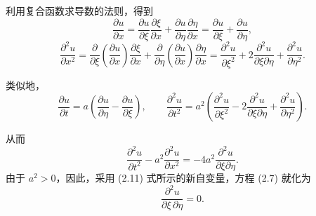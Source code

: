 利用复合函数求导数的法则，得到
\[
\frac{\partial u}{\partial x}
= \frac{\partial u}{\partial \xi}\frac{\partial \xi}{\partial x}
+ \frac{\partial u}{\partial \eta}\frac{\partial \eta}{\partial x}
= \frac{\partial u}{\partial \xi} + \frac{\partial u}{\partial \eta},
\]
\[
\frac{\partial^2 u}{\partial x^2}
= \frac{\partial}{\partial \xi}\!\left(\frac{\partial u}{\partial x}\right)\frac{\partial \xi}{\partial x}
+ \frac{\partial}{\partial \eta}\!\left(\frac{\partial u}{\partial x}\right)\frac{\partial \eta}{\partial x}
= \frac{\partial^2 u}{\partial \xi^2}
+ 2\frac{\partial^2 u}{\partial \xi \partial \eta}
+ \frac{\partial^2 u}{\partial \eta^2}.
\]

类似地，
\[
\frac{\partial u}{\partial t}
= a\!\left(\frac{\partial u}{\partial \eta} - \frac{\partial u}{\partial \xi}\right), \qquad
\frac{\partial^2 u}{\partial t^2}
= a^2\!\left(\frac{\partial^2 u}{\partial \xi^2}
- 2\frac{\partial^2 u}{\partial \xi \partial \eta}
+ \frac{\partial^2 u}{\partial \eta^2}\right).
\]

从而
\[
\frac{\partial^2 u}{\partial t^2}
- a^2 \frac{\partial^2 u}{\partial x^2}
= -4a^2 \frac{\partial^2 u}{\partial \xi \partial \eta}.
\]
由于 $a^2 > 0$，因此，采用 (2.11) 式所示的新自变量，方程 (2.7) 就化为
\begin{equation}
    \frac{\partial^2 u}{\partial \xi \, \partial \eta} = 0.
    \tag{2.12}
\end{equation}


